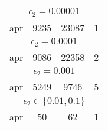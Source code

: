 \begin{figure}[t!]
\begin{floatrow}
{\begin{tabular}{|c|c|c|c|}
			\hline
			\multicolumn{4}{|c|}{$\epsilon_2 = 0.00001$}\\
			\hline
			apr		&  9235	& 23087 &	1\\
			\hline
			\multicolumn{4}{|c|}{$\epsilon_2 = 0.0001$}\\
			\hline
			apr		&  9086 &	22358	& 2\\
			\hline			
			\multicolumn{4}{|c|}{$\epsilon_2 =  0.001$}\\
			\hline
			apr		 &  5249 &	9746 &	5 \\
			\hline			
			\multicolumn{4}{|c|}{$\epsilon_2 \in \{0.01,  0.1\}$}\\
			\hline
			\rowcolor{yellow}
			apr		 &  50	&62&	1\\
			\hline
		\end{tabular}	
	}{}
\end{floatrow}
\end{figure}

